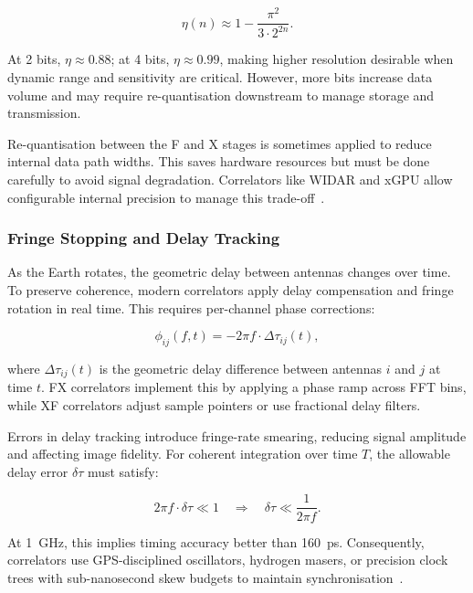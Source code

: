         \begin{equation}
            \eta(n) \approx 1 - \frac{\pi^2}{3 \cdot 2^{2n}}.
        \end{equation}
        
        At 2 bits, \( \eta \approx 0.88 \); at 4 bits, \( \eta \approx 0.99 \), making higher resolution desirable when dynamic range and sensitivity are critical. However, more bits increase data volume and may require re-quantisation downstream to manage storage and transmission.

        Re-quantisation between the F and X stages is sometimes applied to reduce internal data path widths. This saves hardware resources but must be done carefully to avoid signal degradation. Correlators like WIDAR and xGPU allow configurable internal precision to manage this trade-off~\cite{Deller2011}.

        \subsubsection{Fringe Stopping and Delay Tracking}
        As the Earth rotates, the geometric delay between antennas changes over time. To preserve coherence, modern correlators apply delay compensation and fringe rotation in real time. This requires per-channel phase corrections:

        \begin{equation}
            \phi_{ij}(f, t) = -2\pi f \cdot \Delta\tau_{ij}(t),
        \end{equation}

        where \( \Delta\tau_{ij}(t) \) is the geometric delay difference between antennas \( i \) and \( j \) at time \( t \). FX correlators implement this by applying a phase ramp across FFT bins, while XF correlators adjust sample pointers or use fractional delay filters.

        Errors in delay tracking introduce fringe-rate smearing, reducing signal amplitude and affecting image fidelity. For coherent integration over time \( T \), the allowable delay error \( \delta\tau \) must satisfy:

        \begin{equation}
            2\pi f \cdot \delta\tau \ll 1 \quad \Rightarrow \quad \delta\tau \ll \frac{1}{2\pi f}.
        \end{equation}
        
        At 1~GHz, this implies timing accuracy better than 160~ps. Consequently, correlators use GPS-disciplined oscillators, hydrogen masers, or precision clock trees with sub-nanosecond skew budgets to maintain synchronisation~\cite{Romein2021}.

